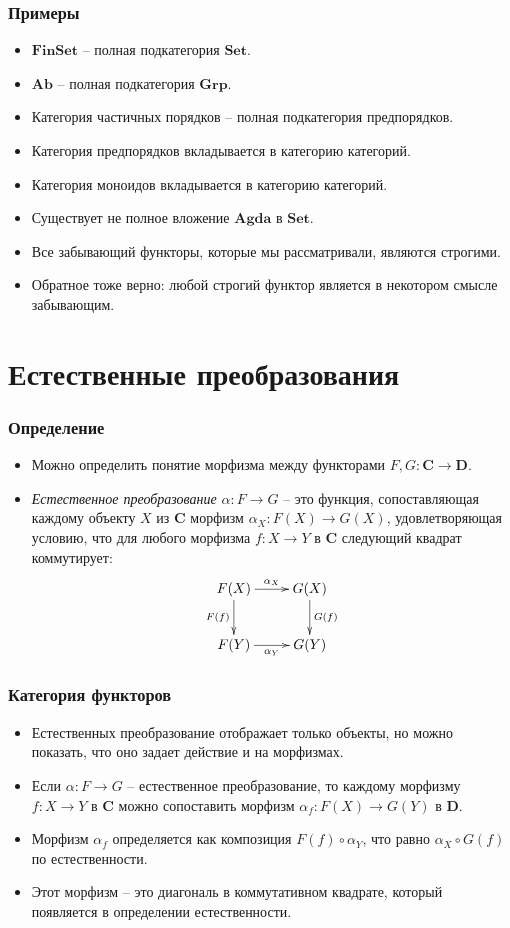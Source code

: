 \documentclass{beamer}
\theoremstyle{definition}
\newcommand{\cat}[1]{\mathbf{#1}}
\renewcommand{\C}{\cat{C}}
\newcommand{\D}{\cat{D}}
\newcommand{\Set}{\cat{Set}}
\newcommand{\Agda}{\cat{Agda}}
\newcommand{\FinSet}{\cat{FinSet}}
\newcommand{\Grp}{\cat{Grp}}
\newcommand{\Ab}{\cat{Ab}}
\begin{document}
\begin{frame}
\frametitle{Примеры}
\begin{itemize}
\item $\FinSet$ -- полная подкатегория $\Set$.
\item $\Ab$ -- полная подкатегория $\Grp$.
\item Категория частичных порядков -- полная подкатегория предпорядков.
\item Категория предпорядков вкладывается в категорию категорий.
\item Категория моноидов вкладывается в категорию категорий.
\item Существует не полное вложение $\Agda$ в $\Set$.
\item Все забывающий функторы, которые мы рассматривали, являются строгими.
\item Обратное тоже верно: любой строгий функтор является в некотором смысле забывающим.
\end{itemize}
\end{frame}

\section{Естественные преобразования}

\begin{frame}
\frametitle{Определение}
\begin{itemize}
\item Можно определить понятие морфизма между функторами $F, G : \C \to \D$.
\item \emph{Естественное преобразование} $\alpha : F \to G$ -- это функция, сопоставляющая каждому объекту $X$ из $\C$ морфизм $\alpha_X : F(X) \to G(X)$, удовлетворяющая условию, что для любого морфизма $f : X \to Y$ в $\C$ следующий квадрат коммутирует:
\[ \xymatrix{ F(X) \ar[r]^{\alpha_X} \ar[d]_{F(f)} & G(X) \ar[d]^{G(f)} \\
              F(Y) \ar[r]_{\alpha_Y}               & G(Y)
            } \]
\end{itemize}
\end{frame}

\begin{frame}
\frametitle{Категория функторов}
\begin{itemize}
\item Естественных преобразование отображает только объекты, но можно показать, что оно задает действие и на морфизмах.
\item Если $\alpha : F \to G$ -- естественное преобразование, то каждому морфизму $f : X \to Y$ в $\C$ можно сопоставить морфизм $\alpha_f : F(X) \to G(Y)$ в $\D$.
\item Морфизм $\alpha_f$ определяется как композиция $F(f) \circ \alpha_Y$, что равно $\alpha_X \circ G(f)$ по естественности.
\item Этот морфизм -- это диагональ в коммутативном квадрате, который появляется в определении естественности.
\end{itemize}
\end{frame}
\end{document}
